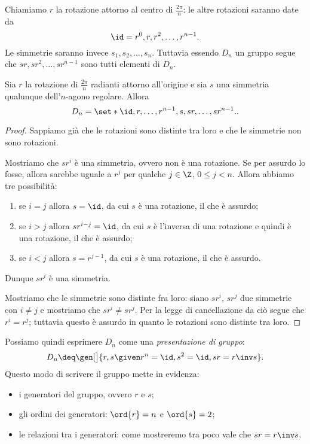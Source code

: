 Chiamiamo $r$ la rotazione attorno al centro di $\frac{2\pi}{n}$: le altre rotazioni saranno date da \[
    \id = r^0, r, r^2, \ldots, r^{n-1}
.\] Le simmetrie saranno invece $s_1, s_2, \ldots, s_n$. Tuttavia essendo $D_n$ un gruppo segue che $sr, sr^2, \ldots, sr^{n-1}$ sono tutti elementi di $D_n$.

\begin{proposition}
    Sia $r$ la rotazione di $\frac{2\pi}{n}$ radianti attorno all'origine e sia $s$ una simmetria qualunque dell'$n$-agono regolare. Allora \[
        D_n = \set*{\id, r, \ldots, r^{n-1}, s, sr, \ldots, sr^{n-1}}.    
    .\] 
\end{proposition}
\begin{proof}
    Sappiamo già che le rotazioni sono distinte tra loro e che le simmetrie non sono rotazioni. 

    Mostriamo che $sr^i$ è una simmetria, ovvero non è una rotazione. Se per assurdo lo fosse, allora sarebbe uguale a $r^j$ per qualche  $j \in \Z$,  $0 \leq j < n$. Allora abbiamo tre possibilità:
     \begin{enumerate}
        \item se $i = j$ allora $s = \id$, da cui $s$ è una rotazione, il che è assurdo;
        \item se $i > j$ allora $sr^{i-j} = \id$, da cui $s$ è l'inversa di una rotazione e quindi è una rotazione, il che è assurdo;
        \item se $i < j$ allora $s = r^{j-1}$, da cui $s$ è una rotazione, il che è assurdo.
    \end{enumerate}
    Dunque $sr^i$ è una simmetria.

    Mostriamo che le simmetrie sono distinte fra loro: siano $sr^i$, $s r^j$ due simmetrie con $i \neq j$ e mostriamo che $sr^i \neq sr^j$. Per la legge di cancellazione da ciò segue che $r^i = r^j$; tuttavia questo è assurdo in quanto le rotazioni sono distinte tra loro.
\end{proof}

Possiamo quindi esprimere $D_n$ come una \emph{presentazione di gruppo}: \[
    D_n \deq \gen[\big]{r, s \given r^n = \id, s^2 = \id, sr = r\inv s}.
\]
Questo modo di scrivere il gruppo mette in evidenza:
\begin{itemize}
    \item i generatori del gruppo, ovvero $r$ e $s$;
    \item gli ordini dei generatori: $\ord{r} = n$ e $\ord{s} = 2$;
    \item le relazioni tra i generatori: come mostreremo tra poco vale che $sr = r\inv s$.
\end{itemize}

